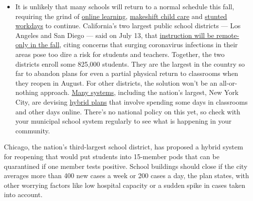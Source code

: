 \begin{itemize}
  \begin{itemize}
  \tightlist
  \item
    It is unlikely that many schools will return to a normal schedule
    this fall, requiring the grind of
    \href{https://www.nytimes3xbfgragh.onion/2020/06/05/us/coronavirus-education-lost-learning.html?action=click\&pgtype=Article\&state=default\&region=MAIN_CONTENT_3\&context=storylines_faq}{online
    learning},
    \href{https://www.nytimes3xbfgragh.onion/2020/05/29/us/coronavirus-child-care-centers.html?action=click\&pgtype=Article\&state=default\&region=MAIN_CONTENT_3\&context=storylines_faq}{makeshift
    child care} and
    \href{https://www.nytimes3xbfgragh.onion/2020/06/03/business/economy/coronavirus-working-women.html?action=click\&pgtype=Article\&state=default\&region=MAIN_CONTENT_3\&context=storylines_faq}{stunted
    workdays} to continue. California's two largest public school
    districts --- Los Angeles and San Diego --- said on July 13, that
    \href{https://www.nytimes3xbfgragh.onion/2020/07/13/us/lausd-san-diego-school-reopening.html?action=click\&pgtype=Article\&state=default\&region=MAIN_CONTENT_3\&context=storylines_faq}{instruction
    will be remote-only in the fall}, citing concerns that surging
    coronavirus infections in their areas pose too dire a risk for
    students and teachers. Together, the two districts enroll some
    825,000 students. They are the largest in the country so far to
    abandon plans for even a partial physical return to classrooms when
    they reopen in August. For other districts, the solution won't be an
    all-or-nothing approach.
    \href{https://bioethics.jhu.edu/research-and-outreach/projects/eschool-initiative/school-policy-tracker/}{Many
    systems}, including the nation's largest, New York City, are
    devising
    \href{https://www.nytimes3xbfgragh.onion/2020/06/26/us/coronavirus-schools-reopen-fall.html?action=click\&pgtype=Article\&state=default\&region=MAIN_CONTENT_3\&context=storylines_faq}{hybrid
    plans} that involve spending some days in classrooms and other days
    online. There's no national policy on this yet, so check with your
    municipal school system regularly to see what is happening in your
    community.
  \end{itemize}
\end{itemize}

Chicago, the nation's third-largest school district, has proposed a
hybrid system for reopening that would put students into 15-member pods
that can be quarantined if one member tests positive. School buildings
should close if the city averages more than 400 new cases a week or 200
cases a day, the plan states, with other worrying factors like low
hospital capacity or a sudden spike in cases taken into account.

